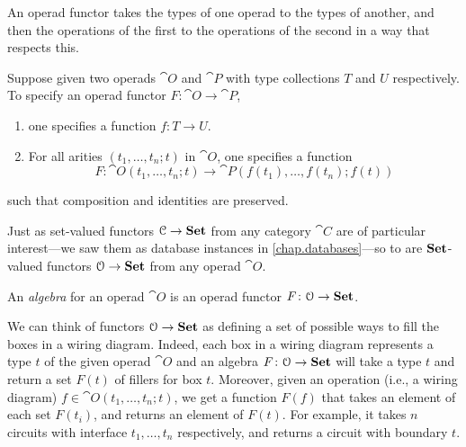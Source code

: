 \documentclass[7Sketches]{subfiles}
\begin{document}
An operad functor takes the types of one operad to the types of another, and
then the operations of the first to the operations of the second in a way that
respects this. 
\begin{roughDef}%
Suppose given two operads $\cat O$ and $\cat P$ with type collections $T$ and $U$ respectively. To specify an
operad functor $F\colon \cat O \to \cat P$,
\begin{enumerate}[label=(\roman*)]
\item one specifies a function $f\colon T \to U$.
\item For all arities $(t_1,\dots,t_n;t)$ in $\cat O$, one specifies a function 
\[
F\colon \cat O(t_1,\dots,t_n;t) \to \cat P(f(t_1),\dots,f(t_n);f(t))
\]
\end{enumerate}
such that composition and identities are preserved.
\end{roughDef}

Just as set-valued functors $\mathcal{C}\to\mathbf{Set}$ from any category $\cat{C}$ are of particular
interest---we saw them as database instances in \cref{chap.databases}---so to are $\mathbf{Set}$-valued functors $\mathcal{O}\to\mathbf{Set}$ from any operad $\cat{O}$.%

\begin{definition}%
An \emph{algebra} for an operad $\cat O$ is an operad functor
$F\colon \mathcal{O} \to \mathbf{Set}$.
\end{definition}

We can think of functors $\mathcal{O}\to\mathbf{Set}$ as defining a set of possible ways to fill the
boxes in a wiring diagram. Indeed, each box in a wiring diagram represents a
type $t$ of the given operad $\cat O$ and an algebra $F\colon \mathcal{O} \to
\mathbf{Set}$ will take a type $t$ and return a set $F(t)$ of fillers for box $t$.  Moreover, given an
operation (i.e., a wiring diagram) $f\in \cat O(t_1,\dots,t_n;t)$, we get a
function $F(f)$ that takes an element of each set $F(t_i)$, and returns an element
of $F(t)$. For example, it takes $n$ circuits with interface
$t_1,\dots,t_n$ respectively, and returns a circuit with boundary $t$.
\end{document}
